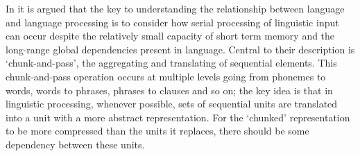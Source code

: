 \documentclass[a4paper,10pt,twoside]{article}
\begin{document}


In \cite{ChristiansenChater2016} it is argued that the key to
understanding the relationship between language and language
processing is to consider how serial processing of linguistic input
can occur despite the relatively small capacity of short term memory
and the long-range global dependencies present in language. Central to
their description is \lq{}chunk-and-pass\rq{}, the aggregating and
translating of sequential elements. This chunk-and-pass operation
occurs at multiple levels going from phonemes to words, words to
phrases, phrases to clauses and so on; the key idea is that in
linguistic processing, whenever possible, sets of sequential units are
translated into a unit with a more abstract representation. For the
\lq{}chunked\rq{} representation to be more compressed than the units
it replaces, there should be some dependency between these
units.

%
%
%
\end{document}
